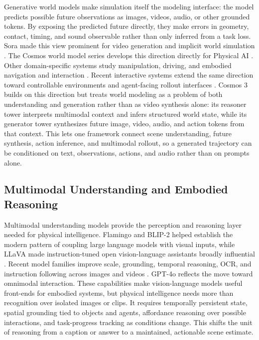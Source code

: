 Generative world models make simulation itself the modeling interface: the model predicts possible future observations as images, videos, audio, or other grounded tokens.
By exposing the predicted future directly, they make errors in geometry, contact, timing, and sound observable rather than only inferred from a task loss.
Sora \citep{sora} made this view prominent for video generation and implicit world simulation \citep{he2025pre}.
The Cosmos world model series develops this direction directly for Physical AI \citep{cosmos_predict2,cosmos_predict2p5,cosmos_transfer1,cosmos_v1}.
Other domain-specific systems study manipulation, driving, and embodied navigation and interaction \citep{wang2023drivedreamer,zhao2025drivedreamer,liang2024dreamitate,jang2025dreamgen,ren2025cosmos,robodreamer,gao2026dreamdojo}.
Recent interactive systems extend the same direction toward controllable environments and agent-facing rollout interfaces \citep{bruce2024genie,genie2,genie3,gaia1,unisim,worldlabs2025marble,bahmani2025lyra,shen2026lyra2,waymo_world_model,li2025wonderplay,wang2025embodiedgen}.
Cosmos 3 builds on this direction but treats world modeling as a problem of both understanding and generation rather than as video synthesis alone: its reasoner tower interprets multimodal context and infers structured world state, while its generator tower synthesizes future image, video, audio, and action tokens from that context.
This lets one framework connect scene understanding, future synthesis, action inference, and multimodal rollout, so a generated trajectory can be conditioned on text, observations, actions, and audio rather than on prompts alone.

\subsection{Multimodal Understanding and Embodied Reasoning}
Multimodal understanding models provide the perception and reasoning layer needed for physical intelligence.
Flamingo \citep{alayrac2022flamingo} and BLIP-2 \citep{li2023blip2} helped establish the modern pattern of coupling large language models with visual inputs, while LLaVA \citep{liu2023visual,llavaonevision} made instruction-tuned open vision-language assistants broadly influential \citep{zhu2023minigpt4}.
Recent model families improve scale, grounding, temporal reasoning, OCR, and instruction following across images and videos \citep{chen2024internvl,wang2025internvl35,dai2024nvlm,bai2023qwen,qwen3vl2025,qwen2p5vl,deitke2024molmo,kosmos2,you2024ferret,zhang2024ferret,mm1,zhang2025mm1,tschannen2025siglip,xiao2024unified,beyer2024versatile,steiner2024family}.
GPT-4o \citep{openai2024gpt4o} reflects the move toward omnimodal interaction.
These capabilities make vision-language models useful front-ends for embodied systems, but physical intelligence needs more than recognition over isolated images or clips.
It requires temporally persistent state, spatial grounding tied to objects and agents, affordance reasoning over possible interactions, and task-progress tracking as conditions change.
This shifts the unit of reasoning from a caption or answer to a maintained, actionable scene estimate.

